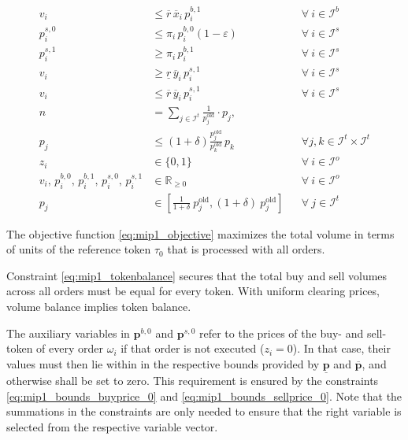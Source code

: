 \documentclass[11pt,parskip=full]{scrartcl}%
\newcommand*{\itokens}{\mathcal{I}^t}       %
\newcommand*{\iorders}{\mathcal{I}^o}       %
\newcommand*{\ibuyorders}{\mathcal{I}^b}    %
\newcommand*{\isellorders}{\mathcal{I}^s}   %
\begin{document}
\begin{small}
\begin{subequations}
\begin{align}
  \\[1mm]
  v_i
  &\le \overline{r} \, \overline{x}_i \, p^{b,1}_i
  && \forall \> i \in \ibuyorders
  \label{eq:mip1_buyorder_volume_ub}
  \\[2mm]
  p^{s,0}_i
  &\le \pi_i \, p^{b,0}_i (1-\varepsilon)
  && \forall \> i \in \isellorders
  \label{eq:mip1_sellorder_disj_0}
  \\[1mm]
  p^{s,1}_i
  &\ge \pi_i \, p^{b,1}_i
  && \forall \> i \in \isellorders
  \label{eq:mip1_sellorder_disj_1}
  \\[1mm]
  v_i
  &\ge \underline{r} \, \overline{y}_i \, p^{s,1}_i
  && \forall \> i \in \isellorders
  \label{eq:mip1_sellorder_volume_lb}
  \\[1mm]
  v_i
  &\le \overline{r} \, \overline{y}_i \, p^{s,1}_i
  && \forall \> i \in \isellorders
  \label{eq:mip1_sellorder_volume_ub}
  \\[2mm]
  n
  &= \sum\limits_{j \in \itokens} \frac{1}{p^\mathrm{old}_j} \cdot p_j,
  \label{eq:mip1_reftoken}
  \\[1mm]
  p_j
  &\le \left(1+\delta\right) \frac{p^\mathrm{old}_j}{p^\mathrm{old}_k} \, p_k
  && \forall j,k \in \itokens \times \itokens
  \label{eq:mip1_maxfluct}
  \\[2mm]
  z_i
  &\in \{0,1\}
  && \forall \> i \in \iorders
  \\[1mm]
  v_i, \, p^{b,0}_i, \, p^{b,1}_i, \, p^{s,0}_i, \, p^{s,1}_i
  &\in \mathbb{R}_{\ge 0}
  && \forall \> i \in \iorders
  \\[1mm]
  p_j
  &\in \left[ \frac{1} {1+\delta} \> p^\mathrm{old}_j, (1+\delta) \> p^\mathrm{old}_j \right]
  && \forall \> j \in \itokens
\end{align}
\label{eq:mip1}
\end{subequations}
\end{small}

The objective function \eqref{eq:mip1_objective} maximizes the total volume in terms of units of
the reference token $ \tau_0 $ that is processed with all orders.

Constraint \eqref{eq:mip1_tokenbalance} secures that the total buy and sell volumes across all
orders must be equal for every token.
With uniform clearing prices, volume balance implies token balance.

The auxiliary variables in $ \mathbf{p}^{b,0} $ and $ \mathbf{p}^{s,0} $ refer to the prices of the
buy- and sell-token of every order $ \omega_i $ if that order is not executed ($ z_i = 0 $).
In that case, their values must then lie within in the respective bounds provided by
$ \underline{\mathbf{p}} $ and $ \overline{\mathbf{p}} $, and otherwise shall be set to zero.
This requirement is ensured by the constraints \eqref{eq:mip1_bounds_buyprice_0} and
\eqref{eq:mip1_bounds_sellprice_0}.
Note that the summations in the constraints are only needed to ensure that the right variable is
selected from the respective variable vector.
\end{document}
